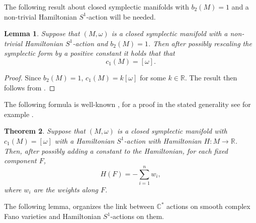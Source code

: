 \documentclass[12pt]{article}
\newtheorem{theorem}{Theorem}[section]
\newtheorem{lemma}[theorem]{Lemma}
\begin{document}
The following result about closed symplectic manifolds with $b_{2}(M)=1$ and a non-trivial Hamiltonian $S^1$-action will be needed. 

\begin{lemma}  \label{symfano}  Suppose that $(M,\omega)$ is a closed symplectic manifold with a non-trivial Hamiltonian $S^1$-action and $b_{2}(M)=1$. Then after possibly rescaling the symplectic form by a positive constant it holds that that $$c_{1}(M)=[\omega].$$
\end{lemma}
\begin{proof}
Since $b_{2}(M)=1$, $c_{1}(M) = k [\omega]$ for some $k \in \mathbb{R}$. The result then follows from \cite[Proposition 1.1]{On}.\end{proof}

The following formula is well-known \cite{CK,GVS,F}, for a proof in the stated generality see for example \cite[Proposition 1.9]{LP1}.
\begin{theorem} \label{wsf}
Suppose that $(M,\omega)$ is a closed symplectic manifold with $c_{1}(M) = [\omega]$ with a Hamiltonian $S^1$-action with Hamiltonian $H: M \rightarrow \mathbb{R}$. Then, after possibly adding a constant to the Hamiltonian, for each fixed component $F$, $$ H(F) = -\sum_{i=1}^{n} w_i ,$$ where $w_i$ are the weights along $F$.
\end{theorem}

The following lemma, organizes the link between $\mathbb{C}^*$ actions on smooth complex Fano varieties and Hamiltonian $S^1$-actions on them.
\end{document}
